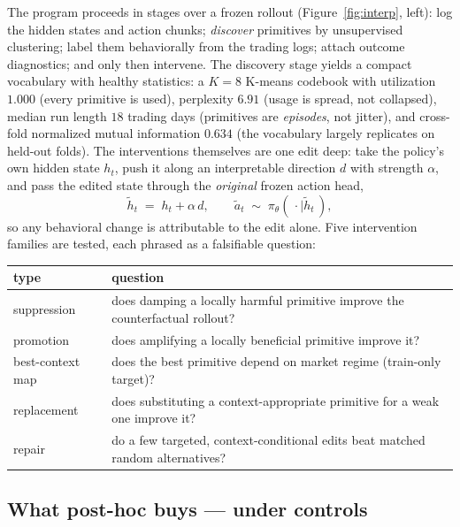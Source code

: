 \documentclass[11pt]{article}
\begin{document}
The program proceeds in stages over a frozen rollout (Figure~\ref{fig:interp}, left): log the
hidden states and action chunks; \emph{discover} primitives by unsupervised clustering; label
them behaviorally from the trading logs; attach outcome diagnostics; and only then intervene.
The discovery stage yields a compact vocabulary with healthy statistics: a $K{=}8$ K-means
codebook with utilization $1.000$ (every primitive is used), perplexity $6.91$ (usage is
spread, not collapsed), median run length $18$ trading days (primitives are \emph{episodes},
not jitter), and cross-fold normalized mutual information $0.634$ (the vocabulary largely
replicates on held-out folds). The interventions themselves are one edit deep: take the
policy's own hidden state $h_t$, push it along an interpretable direction $d$ with strength
$\alpha$, and pass the edited state through the \emph{original} frozen action head,
\begin{equation}
\tilde h_t \;=\; h_t + \alpha\, d, \qquad
\tilde a_t \;\sim\; \pi_\theta(\,\cdot \mid \tilde h_t\,),
\label{eq:intervene}
\end{equation}
so any behavioral change is attributable to the edit alone. Five intervention families are
tested, each phrased as a falsifiable question:
\begin{center}\small
\begin{tabular}{lp{10.2cm}}
\toprule
type & question \\
\midrule
suppression & does damping a locally harmful primitive improve the counterfactual rollout? \\
promotion & does amplifying a locally beneficial primitive improve it? \\
best-context map & does the best primitive depend on market regime (train-only target)? \\
replacement & does substituting a context-appropriate primitive for a weak one improve it? \\
repair & do a few targeted, context-conditional edits beat matched random alternatives? \\
\bottomrule
\end{tabular}
\end{center}

\subsection{What post-hoc buys --- under controls}
\label{sec:interpresults}
\end{document}
